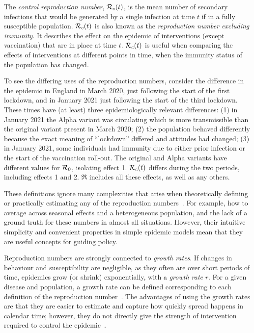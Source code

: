 \documentclass[thesis.tex]{subfiles}
\begin{document}
The \emph{control reproduction number}, $\mathcal{R}_{c}(t)$, is the mean number of secondary infections that would be generated by a single infection at time $t$ if in a fully susceptible population.
$\mathcal{R}_{c}(t)$ is also known as the \emph{reproduction number excluding immunity}.
It describes the effect on the epidemic of interventions (except vaccination) that are in place at time $t$.
$\mathcal{R}_{c}(t)$ is useful when comparing the effects of interventions at different points in time, when the immunity status of the population has changed.

To see the differing uses of the reproduction numbers, consider the difference in the epidemic in England in March 2020, just following the start of the first lockdown, and in January 2021 just following the start of the third lockdown.
These times have (at least) three epidemiologically relevant differences: (1) in January 2021 the Alpha variant was circulating which is more transmissible than the original variant present in March 2020; (2) the population behaved differently because the exact meaning of ``lockdown'' differed and attitudes had changed; (3) in January 2021, some individuals had immunity due to either prior infection or the start of the vaccination roll-out.
The original and Alpha variants have different values for $\mathcal{R}_{0}$, isolating effect 1.
$\mathcal{R}_{c}(t)$ differs during the two periods, including effects 1 and 2.
$\Re$ includes all these effects, as well as any others.

These definitions ignore many complexities that arise when theoretically defining or practically estimating any of the reproduction numbers~\autocite{pellisEstimation}.
For example, how to average across seasonal effects and a heterogeneous population, and the lack of a ground truth for these numbers in almost all situations.
However, their intuitive simplicity and convenient properties in simple epidemic models mean that they are useful concepts for guiding policy.

Reproduction numbers are strongly connected to \emph{growth rates}.
If changes in behaviour and susceptibility are negligible, as they often are over short periods of time, epidemics grow (or shrink) exponentially, with a \emph{growth rate} $r$.
For a given disease and population, a growth rate can be defined corresponding to each definition of the reproduction number~\autocite{pellisEstimation,paragGrowthRates,wallingaGI}.
The advantages of using the growth rates are that they are easier to estimate and capture how quickly spread happens in calendar time; however, they do not directly give the strength of intervention required to control the epidemic~\autocite{royalSocietyRnumber}.
\end{document}
